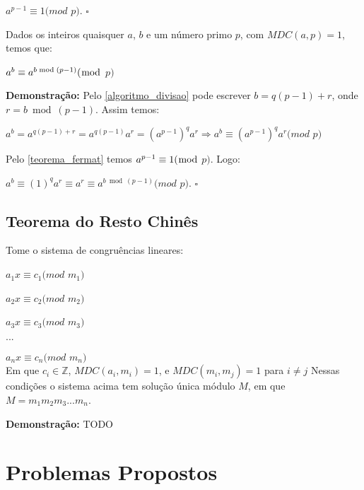 $a^{p-1}\equiv 1(mod$ $p)$. $\square$
\\


\begin{theorem}\label{teorema_fermat_expansao}
Dados os inteiros quaisquer $a$, $b$ e um número primo $p$, com $MDC(a, p) = 1$, temos que:

$a^{b} \equiv a^{b \bmod (p-1)} (\bmod$ $p)$

\end{theorem}
\textbf{Demonstração:}
Pelo \autoref{algoritmo_divisao} pode escrever $b=q(p-1)+r$, onde $r=b\bmod(p-1)$. Assim temos:

$a^b = a^{q(p-1)+r} = a^{q(p-1)}a^r = (a^{p-1})^qa^r \Rightarrow a^b \equiv (a^{p-1})^qa^r (mod$ $p)$ 

Pelo \autoref{teorema_fermat} temos $a^{p-1} \equiv 1 (\bmod$ $p)$. Logo:

$a^b \equiv (1)^qa^r \equiv a^r \equiv a^{b \bmod (p-1)} (mod$ $p)$. $\square$
\\


\subsection{Teorema do Resto Chinês}

\begin{theorem}
Tome o sistema de congruências lineares:

$a_1x \equiv c_1 (mod$ $m_1)$

$a_2x \equiv c_2 (mod$ $m_2)$

$a_3x \equiv c_3 (mod$ $m_3)$

$...$

$a_nx \equiv c_n (mod$ $m_n)$\\

Em que $c_i \in \mathbb{Z}$, $MDC(a_i,m_i) = 1$, e $MDC(m_i, m_j) = 1$ para $i \neq j$
Nessas condições o sistema acima tem solução única módulo $M$, em que $M = m_1m_2m_3...m_n$.
\end{theorem}
\textbf{Demonstração:}
TODO





\section{Problemas Propostos}



